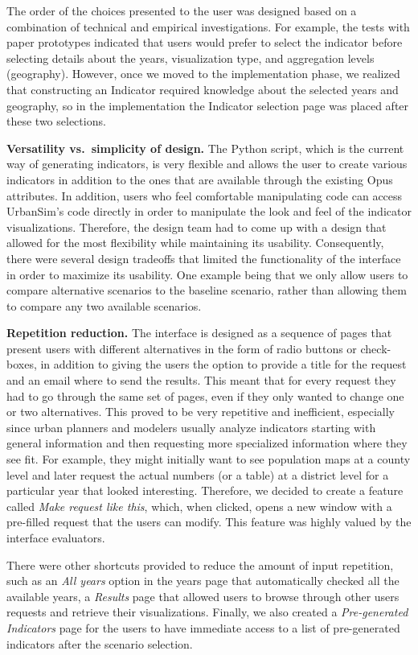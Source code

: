 The order of the choices presented to the user was designed based on a
combination of technical and empirical investigations.  For example, the
tests with paper prototypes indicated that users would prefer to select the
indicator before selecting details about the years, visualization type, and
aggregation levels (geography).  However, once we moved to the
implementation phase, we realized that constructing an Indicator required
knowledge about the selected years and geography, so in the implementation
the Indicator selection page was placed after these two selections.

{\bf Versatility vs.\ simplicity of design.}      
The Python script, which is the current way of generating indicators, is
very flexible and allows the user to create various indicators in addition to
the ones that are available through the existing
Opus attributes. In addition, users
who feel comfortable manipulating code can access UrbanSim's code directly
in order to manipulate the look and feel of the indicator
visualizations. Therefore, the design team had to come up with a design
that allowed for the most flexibility while maintaining its
usability. Consequently, there were several design tradeoffs that limited
the functionality of the interface in order to maximize its usability. One
example being that we only allow users to compare alternative scenarios to
the baseline scenario, rather than allowing them to compare any two
available scenarios.

{\bf Repetition reduction.} The interface is designed as a 
sequence of pages that present users with different 
alternatives in the form of radio buttons or check-boxes, in addition to
giving the users the option to provide a title for the request and an
email where to send the results. This meant that for every request they
had to go through the same set of pages, even if they only wanted to change
one or two alternatives. This proved to be very repetitive and
inefficient, especially since urban planners and modelers usually analyze
indicators starting with general information and then requesting more
specialized information where they see fit. For example, they might
initially want to see population maps at a county level and later request
the actual numbers (or a table) at a district level for a particular year
that looked interesting. Therefore, we decided to create a
feature called \emph{Make request like this}, which, when clicked, opens a new
window with a pre-filled request that the users can modify. This feature
was highly valued by the interface evaluators.

There were other shortcuts provided to reduce the amount of input
repetition, such as an \emph{All years} option in the years page that
automatically checked all the available years, a \emph{Results} page that
allowed users to browse through other users requests and retrieve their
visualizations. Finally, we also created a \emph{Pre-generated Indicators} page
for the users to have immediate access to a list of pre-generated
indicators after the scenario selection.

